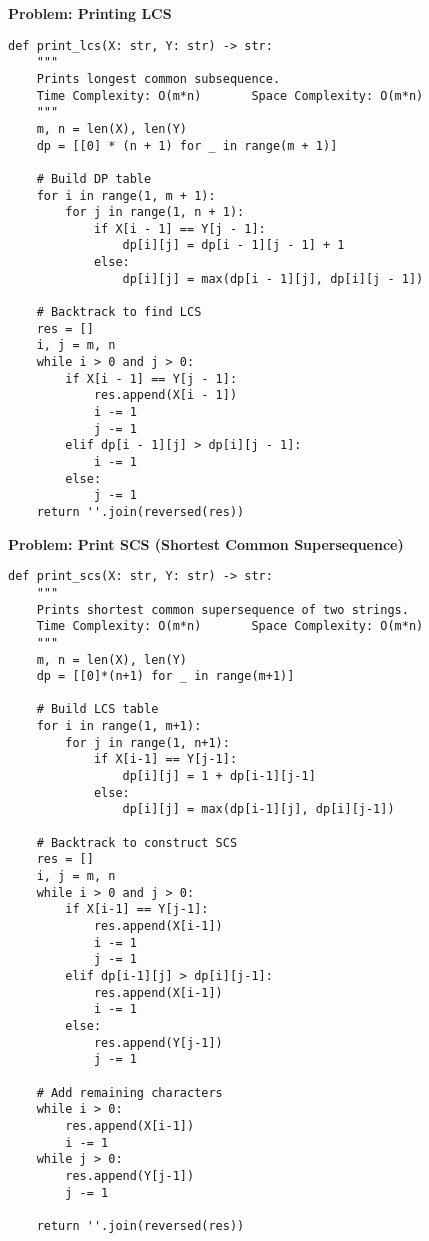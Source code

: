 \noindent\textbf{Problem: Printing LCS}
\begin{verbatim}
def print_lcs(X: str, Y: str) -> str:
    """
    Prints longest common subsequence.
    Time Complexity: O(m*n)       Space Complexity: O(m*n)
    """
    m, n = len(X), len(Y)
    dp = [[0] * (n + 1) for _ in range(m + 1)]
    
    # Build DP table
    for i in range(1, m + 1):
        for j in range(1, n + 1):
            if X[i - 1] == Y[j - 1]:
                dp[i][j] = dp[i - 1][j - 1] + 1
            else:
                dp[i][j] = max(dp[i - 1][j], dp[i][j - 1])
    
    # Backtrack to find LCS
    res = []
    i, j = m, n
    while i > 0 and j > 0:
        if X[i - 1] == Y[j - 1]:
            res.append(X[i - 1])
            i -= 1
            j -= 1
        elif dp[i - 1][j] > dp[i][j - 1]:
            i -= 1
        else:
            j -= 1
    return ''.join(reversed(res))
\end{verbatim}
\noindent\textbf{Problem: Print SCS (Shortest Common Supersequence)}
\begin{verbatim}
def print_scs(X: str, Y: str) -> str:
    """
    Prints shortest common supersequence of two strings.
    Time Complexity: O(m*n)       Space Complexity: O(m*n)
    """
    m, n = len(X), len(Y)
    dp = [[0]*(n+1) for _ in range(m+1)]
    
    # Build LCS table
    for i in range(1, m+1):
        for j in range(1, n+1):
            if X[i-1] == Y[j-1]:
                dp[i][j] = 1 + dp[i-1][j-1]
            else:
                dp[i][j] = max(dp[i-1][j], dp[i][j-1])
    
    # Backtrack to construct SCS
    res = []
    i, j = m, n
    while i > 0 and j > 0:
        if X[i-1] == Y[j-1]:
            res.append(X[i-1])
            i -= 1
            j -= 1
        elif dp[i-1][j] > dp[i][j-1]:
            res.append(X[i-1])
            i -= 1
        else:
            res.append(Y[j-1])
            j -= 1
    
    # Add remaining characters
    while i > 0:
        res.append(X[i-1])
        i -= 1
    while j > 0:
        res.append(Y[j-1])
        j -= 1
        
    return ''.join(reversed(res))
\end{verbatim}

